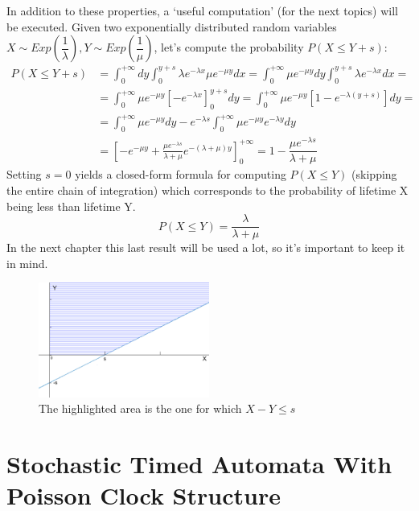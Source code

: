 \documentclass[12pt,a4paper]{article}
\begin{document}
In addition to these properties, a `useful computation' (for the next topics) will be executed. Given two exponentially distributed random variables $X\sim Exp\left(\dfrac{1}{\lambda}\right),Y\sim Exp\left(\dfrac{1}{\mu}\right)$, let's compute the probability $P(X \leq Y+s)$:
\begin{equation*}
\begin{aligned}
P(X \leq Y+s) &= \int_{0}^{+\infty}dy\int_{0}^{y+s}\lambda e^{-\lambda x}\mu e^{-\mu y}dx
= \int_{0}^{+\infty}\mu e^{-\mu y}dy\int_{0}^{y+s}\lambda e^{-\lambda x}dx = 
\\
&=\int_{0}^{+\infty}\mu e^{-\mu y}\left[ -e^{-\lambda x}\right]_0^{y+s}dy
= \int_{0}^{+\infty}\mu e^{-\mu y}\left[ 1-e^{-\lambda(y+s)}\right]dy =
\\
&= \int_{0}^{+\infty}\mu e^{-\mu y}dy - e^{-\lambda s}\int_{0}^{+\infty}\mu e^{-\mu y} e^{-\lambda y}dy\\
&= \left[-e^{-\mu y} + \frac{\mu e^{-\lambda s}}{\lambda + \mu}e^{-(\lambda+\mu)y}\right]_{0}^{+\infty}
= 1-\dfrac{\mu e^{-\lambda s}}{\lambda + \mu}
\end{aligned}
\end{equation*}
Setting $s=0$ yields a closed-form formula for computing $P(X\leq Y)$ (skipping the entire chain of integration) which corresponds to the probability of lifetime X being less than lifetime Y.
\begin{equation}
\label{eq:xlessy}
P(X\leq Y)= \frac{\lambda}{\lambda + \mu}
\end{equation}
In the next chapter this last result will be used a lot, so it's important to keep it in mind.
\begin{figure}[H]
\begin{center}
\includegraphics[width=0.5\textwidth]{IMG/CommArea2.eps}
\caption{The highlighted area is the one for which $X-Y\leq s$}
\label{Picture 2}
\end{center}
\end{figure}
\newpage
\section{Stochastic Timed Automata With Poisson Clock Structure}
\label{sec:STAWPCS}
\end{document}
